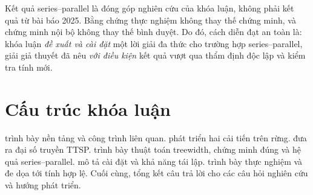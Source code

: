 Kết quả series--parallel là đóng góp nghiên cứu của khóa luận, không phải kết quả từ bài báo 2025. Bằng chứng thực nghiệm không thay thế chứng minh, và chứng minh nội bộ không thay thế bình duyệt. Do đó, cách diễn đạt an toàn là: khóa luận \emph{đề xuất và cài đặt} một lời giải đa thức cho trường hợp series--parallel, giải giả thuyết đã nêu \emph{với điều kiện} kết quả vượt qua thẩm định độc lập và kiểm tra tính mới.

\section{Cấu trúc khóa luận}

 trình bày nền tảng và công trình liên quan.  phát triển hai cải tiến trên rừng.  đưa ra đại số truyền TTSP.  trình bày thuật toán treewidth, chứng minh đúng và hệ quả series--parallel.  mô tả cài đặt và khả năng tái lập.  trình bày thực nghiệm và đe dọa tới tính hợp lệ. Cuối cùng,  tổng kết câu trả lời cho các câu hỏi nghiên cứu và hướng phát triển.

